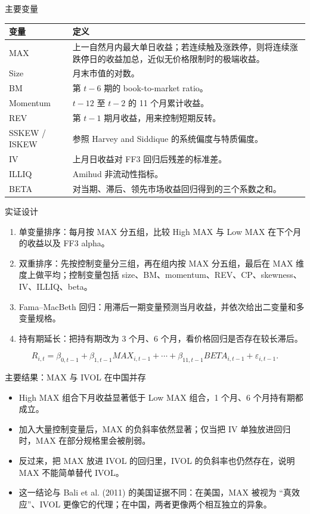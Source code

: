 \documentclass[aspectratio=169,10pt]{beamer}
\newcommand{\tighttable}{\scriptsize\setlength{\tabcolsep}{3pt}\renewcommand{\arraystretch}{1.12}}
\begin{document}
\begin{frame}[c]{主要变量}
	\tighttable
	\begin{tabularx}{\textwidth}{lY}
		\toprule
		变量 & 定义 \\
		\midrule
		MAX & 上一自然月内最大单日收益；若连续触及涨跌停，则将连续涨跌停日的收益加总，近似无价格限制时的极端收益。\\
		Size & 月末市值的对数。\\
		BM & 第 $t-6$ 期的 book-to-market ratio。\\
		Momentum & $t-12$ 至 $t-2$ 的 11 个月累计收益。\\
		REV & 第 $t-1$ 期月收益，用来控制短期反转。\\
		SSKEW / ISKEW & 参照 Harvey and Siddique 的系统偏度与特质偏度。\\
		IV & 上月日收益对 FF3 回归后残差的标准差。\\
		ILLIQ & Amihud 非流动性指标。\\
		BETA & 对当期、滞后、领先市场收益回归得到的三个系数之和。\\
		\bottomrule
	\end{tabularx}
\end{frame}

\begin{frame}{实证设计}
	\begin{enumerate}
		\item 单变量排序：每月按 MAX 分五组，比较 High MAX 与 Low MAX 在下个月的收益以及 FF3 alpha。
		\item 双重排序：先按控制变量分三组，再在组内按 MAX 分五组，最后在 MAX 维度上做平均；控制变量包括 size、BM、momentum、REV、CP、skewness、IV、ILLIQ、beta。
		\item Fama--MacBeth 回归：用滞后一期变量预测当月收益，并依次给出二变量和多变量规格。
		\item 持有期延长：把持有期改为 3 个月、6 个月，看价格回归是否存在较长滞后。
	\end{enumerate}
	\vspace{4pt}
	\[
	R_{i,t} = \beta_{0,t-1}+\beta_{1,t-1}MAX_{i,t-1}+\cdots+\beta_{11,t-1}BETA_{i,t-1}+\varepsilon_{i,t-1}.
	\]
\end{frame}

\begin{frame}{主要结果：MAX 与 IVOL 在中国并存}
	\begin{itemize}
		\item High MAX 组合下月收益显著低于 Low MAX 组合，1 个月、6 个月持有期都成立。
		\item 加入大量控制变量后，MAX 的负斜率依然显著；仅当把 IV 单独放进回归时，MAX 在部分规格里会被削弱。
		\item 反过来，把 MAX 放进 IVOL 的回归里，IVOL 的负斜率也仍然存在，说明 MAX 不能简单替代 IVOL。
		\item 这一结论与 Bali et al. (2011) 的美国证据不同：在美国，MAX 被视为 ``真效应''、IVOL 更像它的代理；在中国，两者更像两个相互独立的异象。
	\end{itemize}
\end{frame}
\end{document}
